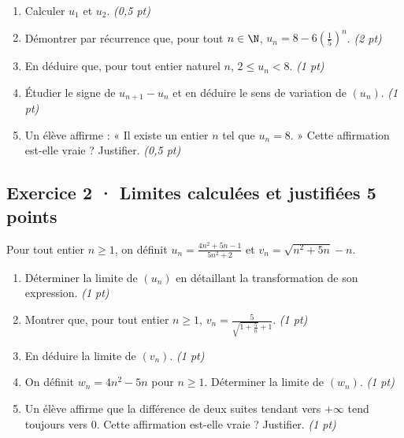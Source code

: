 \begin{enumerate}

\item Calculer $u_1$ et $u_2$. \hfill\textit{(0,5 pt)}

\item Démontrer par récurrence que, pour tout $n\in\N$, $u_n=8-6\left(\frac{1}{5}\right)^n$. \hfill\textit{(2 pt)}

\item En déduire que, pour tout entier naturel $n$, $2\le u_n<8$. \hfill\textit{(1 pt)}

\item Étudier le signe de $u_{n+1}-u_n$ et en déduire le sens de variation de $(u_n)$. \hfill\textit{(1 pt)}

\item Un élève affirme : « Il existe un entier $n$ tel que $u_n=8$. » Cette affirmation est-elle vraie ? Justifier. \hfill\textit{(0,5 pt)}

\end{enumerate}

\subsection*{Exercice 2 · Limites calculées et justifiées \hfill 5 points}Pour tout entier $n\ge1$, on définit $u_n=\frac{4n^2+5n-1}{5n^2+2}$ et $v_n=\sqrt{n^2+5n}-n$.

\begin{enumerate}

\item Déterminer la limite de $(u_n)$ en détaillant la transformation de son expression. \hfill\textit{(1 pt)}

\item Montrer que, pour tout entier $n\ge1$, $v_n=\frac{5}{\sqrt{1+\frac{5}n}+1}$. \hfill\textit{(1 pt)}

\item En déduire la limite de $(v_n)$. \hfill\textit{(1 pt)}

\item On définit $w_n=4n^2-5n$ pour $n\ge1$. Déterminer la limite de $(w_n)$. \hfill\textit{(1 pt)}

\item Un élève affirme que la différence de deux suites tendant vers $+\infty$ tend toujours vers $0$. Cette affirmation est-elle vraie ? Justifier. \hfill\textit{(1 pt)}

\end{enumerate}

